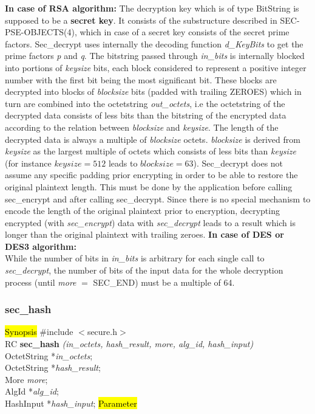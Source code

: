 {\bf In case of RSA algorithm:}
\be
\m The decryption key which is of type BitString is supposed to be
   a {\bf secret key}. It consists of the substructure described in
   SEC-PSE-OBJECTS(4), which in case of a secret key consists of the secret
   prime factors. Sec\_decrypt uses internally the
   decoding function {\em d\_KeyBits} to get the prime factors {\em p} and {\em q}.
\m The bitstring passed through {\em in\_bits} is internally blocked into portions of
   {\em keysize} bits, each block considered to represent a positive integer number with the first bit
   being the most significant bit. These blocks are decrypted into blocks of {\em blocksize} bits
   (padded with trailing ZEROES) which in turn are combined into the octetstring {\em out\_octets}, i.e
   the octetstring of the decrypted data consists of less bits than the bitstring 
   of the encrypted data
   according to the relation between {\em blocksize} and {\em keysize}.
   The length of the decrypted data is always a multiple of {\em blocksize} octets.
   {\em blocksize} is derived from {\em keysize} as the largest multiple of octets which consists of
   less bits than {\em keysize} (for instance $keysize = 512$ leads to $blocksize = 63$).
\m Sec\_decrypt does not assume any specific padding prior encrypting in order to be able to
   restore the original plaintext length. This must be done by the application before 
   calling  sec\_encrypt and after calling sec\_decrypt.
\m Since there is no special mechanism to encode the length of the original plaintext prior
   to encryption, decrypting encrypted (with {\em sec\_encrypt}) data with {\em sec\_decrypt}
   leads to a result which is longer than the original plaintext with trailing zeroes.
\ee
{\bf In case of DES or DES3 algorithm:} \\ [1em]
   While the number of bits in {\em in\_bits} is arbitrary for each single call to
   {\em sec\_decrypt}, the number of bits of the input data for the whole
   decryption process (until {\em more} $=$ SEC\_END) must be a multiple of 64. 


\subsubsection{sec\_hash}
\label{sec_hash}
\hl{Synopsis}
\#include $<$secure.h$>$ \\ [0.5cm]
RC {\bf sec\_hash} {\em (in\_octets, hash\_result, more, alg\_id, hash\_input)} \\
OctetString *{\em in\_octets}; \\
OctetString *{\em hash\_result}; \\
More {\em more}; \\
AlgId *{\em alg\_id}; \\
HashInput *{\em hash\_input};
\hl{Parameter}


